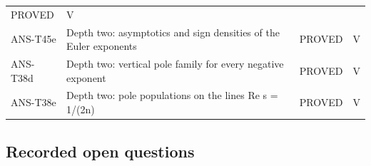 \documentclass[
  11pt,
]{article}
\begin{document}
\begin{longtable}[]{@{}llll@{}}
\begin{minipage}[t]{0.22\columnwidth}
PROVED\strut
\end{minipage} & \begin{minipage}[t]{0.10\columnwidth}\raggedright
V\strut
\end{minipage}\tabularnewline
\begin{minipage}[t]{0.16\columnwidth}\raggedright
ANS-T45e\strut
\end{minipage} & \begin{minipage}[t]{0.41\columnwidth}\raggedright
Depth two: asymptotics and sign densities of the Euler exponents\strut
\end{minipage} & \begin{minipage}[t]{0.22\columnwidth}\raggedright
PROVED\strut
\end{minipage} & \begin{minipage}[t]{0.10\columnwidth}\raggedright
V\strut
\end{minipage}\tabularnewline
\begin{minipage}[t]{0.16\columnwidth}\raggedright
ANS-T38d\strut
\end{minipage} & \begin{minipage}[t]{0.41\columnwidth}\raggedright
Depth two: vertical pole family for every negative exponent\strut
\end{minipage} & \begin{minipage}[t]{0.22\columnwidth}\raggedright
PROVED\strut
\end{minipage} & \begin{minipage}[t]{0.10\columnwidth}\raggedright
V\strut
\end{minipage}\tabularnewline
\begin{minipage}[t]{0.16\columnwidth}\raggedright
ANS-T38e\strut
\end{minipage} & \begin{minipage}[t]{0.41\columnwidth}\raggedright
Depth two: pole populations on the lines Re s = 1/(2n)\strut
\end{minipage} & \begin{minipage}[t]{0.22\columnwidth}\raggedright
PROVED\strut
\end{minipage} & \begin{minipage}[t]{0.10\columnwidth}\raggedright
V\strut
\end{minipage}\tabularnewline
\bottomrule
\end{longtable}

\hypertarget{recorded-open-questions-5}{%
\subsection{Recorded open questions}\label{recorded-open-questions-5}}
\end{document}
